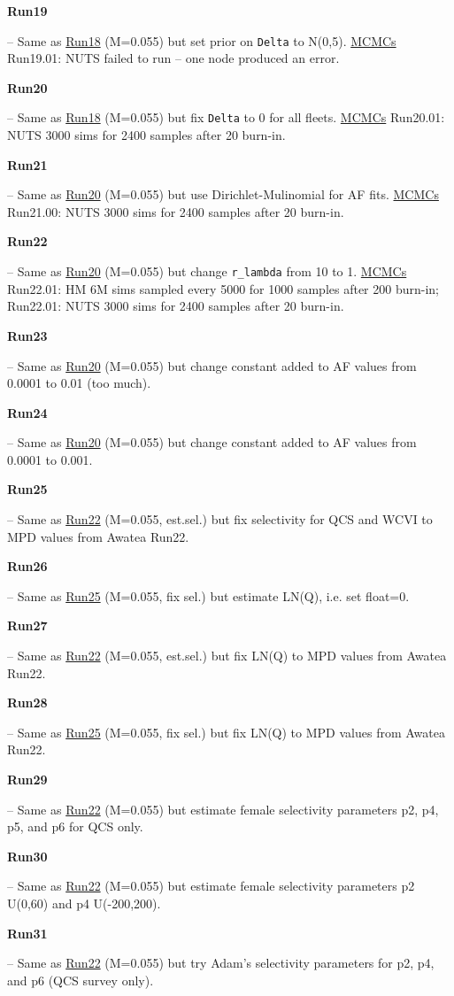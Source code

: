 \hypertarget{R19}{\textbf{Run19}} -- Same as \hyperlink{R18}{Run18} (M=0.055) but set prior on \texttt{Delta} to N(0,5). \underline{MCMCs} Run19.01: NUTS failed to run -- one node produced an error.

\hypertarget{R20}{\textbf{Run20}} -- Same as \hyperlink{R18}{Run18} (M=0.055) but fix \texttt{Delta} to 0 for all fleets. \underline{MCMCs} Run20.01: NUTS 3000 sims for 2400 samples after 20\pc{} burn-in.

\hypertarget{R21}{\textbf{Run21}} -- Same as \hyperlink{R20}{Run20} (M=0.055) but use Dirichlet-Mulinomial for AF fits. \underline{MCMCs} Run21.00: NUTS 3000 sims for 2400 samples after 20\pc{} burn-in.

\hypertarget{R22}{\textbf{Run22}} -- Same as \hyperlink{R20}{Run20} (M=0.055) but change \texttt{r\_lambda} from 10 to 1. \underline{MCMCs} Run22.01: HM 6M sims sampled every 5000 for 1000 samples after 200 burn-in;  Run22.01: NUTS 3000 sims for 2400 samples after 20\pc{} burn-in.

\hypertarget{R23}{\textbf{Run23}} -- Same as \hyperlink{R20}{Run20} (M=0.055) but change constant added to AF values from 0.0001 to 0.01 (too much).

\hypertarget{R24}{\textbf{Run24}} -- Same as \hyperlink{R20}{Run20} (M=0.055) but change constant added to AF values from 0.0001 to 0.001.

\hypertarget{R25}{\textbf{Run25}} -- Same as \hyperlink{R22}{Run22} (M=0.055, est.sel.) but fix selectivity for QCS and WCVI to MPD values from Awatea Run22.

\hypertarget{R26}{\textbf{Run26}} -- Same as \hyperlink{R25}{Run25} (M=0.055, fix sel.) but estimate LN(Q), i.e. set float=0.

\hypertarget{R27}{\textbf{Run27}} -- Same as \hyperlink{R22}{Run22} (M=0.055, est.sel.) but fix LN(Q) to MPD values from Awatea Run22.

\hypertarget{R28}{\textbf{Run28}} -- Same as \hyperlink{R25}{Run25} (M=0.055, fix sel.) but fix LN(Q) to MPD values from Awatea Run22.

\hypertarget{R29}{\textbf{Run29}} -- Same as \hyperlink{R22}{Run22} (M=0.055) but estimate female selectivity parameters p2, p4, p5, and p6 for QCS only.

\hypertarget{R30}{\textbf{Run30}} -- Same as \hyperlink{R22}{Run22} (M=0.055) but estimate female selectivity parameters p2 U(0,60) and p4 U(-200,200).

\hypertarget{R31}{\textbf{Run31}} -- Same as \hyperlink{R22}{Run22} (M=0.055) but try Adam's selectivity parameters for p2, p4, and p6 (QCS survey only).

